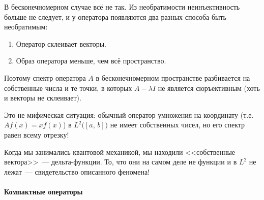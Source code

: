 \documentclass{trlnotes}
\begin{document}
    В бесконечномерном случае всё не так. Из необратимости неинъективность больше не следует, и у оператора появляются два разных способа быть необратимым:

    \begin{enumerate}
        \item Оператор склеивает векторы.
        \item Образ оператора меньше, чем всё пространство.
    \end{enumerate}

    Поэтому спектр оператора $A$ в бесконечномерном пространстве разбивается на собственные числа и те точки, в которых $A - \lambda I$ не является сюръективным (хоть и векторы не склеивает). 

    \begin{rem}
        Это не мифическая ситуация: обычный оператор умножения на координату (т.е. $Af(x) = x f(x)$) в $L^2\big([a, \, b]\big)$ не имеет собственных чисел, но его спектр равен всему отрезку! 

        Когда мы занимались квантовой механикой, мы находили <<собственные вектора>>~--- дельта-функции. То, что они на самом деле не функции и в $L^2$ не лежат~--- свидетельство описанного феномена!
    \end{rem}

    \paragraph{Компактные операторы}
\end{document}
